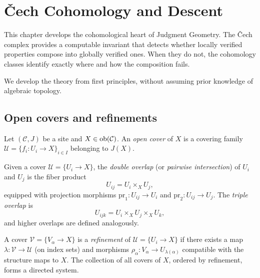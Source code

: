 \chapter{\v{C}ech Cohomology and Descent}
\label{ch:cech}

This chapter develops the cohomological heart of Judgment Geometry.
The \v{C}ech complex provides a computable invariant that detects
whether locally verified properties compose into globally verified
ones.  When they do not, the cohomology classes identify exactly where
and how the composition fails.

We develop the theory from first principles, without assuming prior
knowledge of algebraic topology.


\section{Open covers and refinements}
\label{sec:cech:covers}

\begin{definition}
\label{def:open-cover}
Let $(\mathcal{C}, J)$ be a site and $X \in \mathrm{ob}(\mathcal{C})$.  An
\emph{open cover} of $X$ is a covering family
$\mathcal{U} = \{f_i : U_i \to X\}_{i \in I}$ belonging to $J(X)$.
\end{definition}

\begin{definition}[Overlaps]
\label{def:overlaps}
Given a cover $\mathcal{U} = \{U_i \to X\}$, the \emph{double overlap}
(or \emph{pairwise intersection}) of $U_i$ and $U_j$ is the fiber
product
\[
  U_{ij} = U_i \times_X U_j,
\]
equipped with projection morphisms $\mathrm{pr}_1 : U_{ij} \to U_i$
and $\mathrm{pr}_2 : U_{ij} \to U_j$.  The \emph{triple overlap} is
\[
  U_{ijk} = U_i \times_X U_j \times_X U_k,
\]
and higher overlaps are defined analogously.
\end{definition}

\begin{definition}
\label{def:cover-refinement}
A cover $\mathcal{V} = \{V_\alpha \to X\}$ is a \emph{refinement} of
$\mathcal{U} = \{U_i \to X\}$ if there exists a map
$\lambda : \mathcal{V} \to \mathcal{U}$ (on index sets) and morphisms
$\rho_\alpha : V_\alpha \to U_{\lambda(\alpha)}$ compatible with the
structure maps to $X$.  The collection of all covers of $X$, ordered
by refinement, forms a directed system.
\end{definition}


